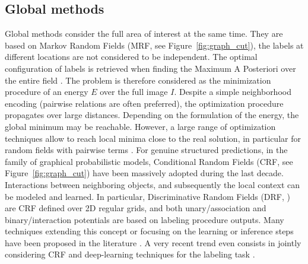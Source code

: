 \subsection{Global methods}
Global methods consider the full area of interest at the same time. They are based on Markov Random Fields (MRF, see Figure~\ref{fig:graph_cut}), the labels at different locations are not considered to be independent. The optimal configuration of labels is retrieved when finding the Maximum A Posteriori over the entire field \citep{Gab_MRF}. The problem is therefore considered as the minimization procedure of an energy $E$ over the full image $I$. Despite a simple neighborhood encoding (pairwise relations are often preferred), the optimization procedure propagates over large distances. Depending on the formulation of the energy, the global minimum may be reachable. However, a large range of optimization techniques allow to reach local minima close to the real solution, in particular for random fields with pairwise terms \citep{kolmogorov2004energy}. For genuine structured predictions, in the family of graphical probabilistic models, Conditional Random Fields (CRF, see Figure~\ref{fig:graph_cut}) have been massively adopted during the last decade. Interactions between neighboring objects, and subsequently the local context can be modeled and learned. In particular, Discriminative Random Fields (DRF, \citep{DRF}) are CRF defined over 2D regular grids, and both unary/association and binary/interaction potentials are based on labeling procedure outputs. Many techniques extending this concept or focusing on the learning or inference steps have been proposed in the literature \citep{ijcv_kohli09,Ladicky2012}. A very recent trend even consists in jointly considering CRF and deep-learning techniques for the labeling task \citep{CNN_CRF}.\\

